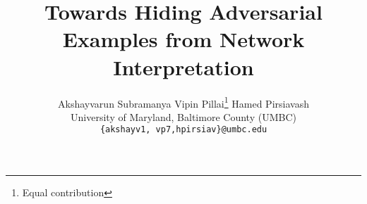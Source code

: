 \documentclass[10pt,twocolumn,letterpaper]{article}
\begin{document}
\title{Towards Hiding Adversarial Examples from Network Interpretation}

\author{
     Akshayvarun Subramanya\footnotemark[1] \qquad
     Vipin Pillai\thanks{Equal contribution} \qquad Hamed Pirsiavash\\
    University of Maryland, Baltimore County (UMBC)\\
    \tt\small{\{akshayv1, vp7,hpirsiav\}@umbc.edu} \\
}


\maketitle
\end{document}
